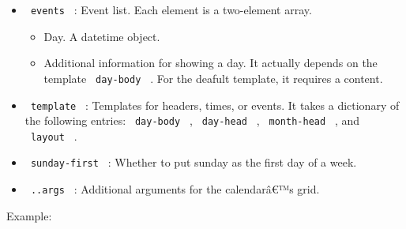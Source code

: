 \begin{itemize}
\tightlist
\item
  \texttt{\ events\ } : Event list. Each element is a two-element array.

  \begin{itemize}
  \tightlist
  \item
    Day. A datetime object.
  \item
    Additional information for showing a day. It actually depends on the
    template \texttt{\ day-body\ } . For the deafult template, it
    requires a content.
  \end{itemize}
\item
  \texttt{\ template\ } : Templates for headers, times, or events. It
  takes a dictionary of the following entries: \texttt{\ day-body\ } ,
  \texttt{\ day-head\ } , \texttt{\ month-head\ } , and
  \texttt{\ layout\ } .
\item
  \texttt{\ sunday-first\ } : Whether to put sunday as the first day of
  a week.
\item
  \texttt{\ ..args\ } : Additional arguments for the calendarâ€™s grid.
\end{itemize}

Example:

\begin{Shaded}
\begin{Highlighting}[]
\NormalTok{)}

\NormalTok{  )}
\NormalTok{)}
\end{Highlighting}
\end{Shaded}

